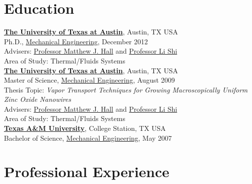 \documentclass[centered]{res}
\begin{document}
\begin{resume}
\section{Education}
%
\href{http://www.utexas.edu/}{\textbf{The University of Texas at
    Austin}}, Austin, TX USA \\
Ph.D., \href{http://www.me.utexas.edu/}{Mechanical Engineering},
December 2012 \\
Advisers:
\href{http://www.me.utexas.edu/directory/faculty/hall/matthew/33/}{Professor
  Matthew J. Hall} and \href{http://www.me.utexas.edu/~lishi/}{Professor Li Shi}\\
Area of Study: Thermal/Fluids Systems \\
%
\href{http://www.utexas.edu/}{\textbf{The University of Texas at
    Austin}}, Austin, TX USA \\
Master of Science, \href{http://www.me.utexas.edu/}{Mechanical
  Engineering}, August
2009 \\
Thesis Topic: \emph{Vapor Transport Techniques for Growing
  Macroscopically Uniform Zinc Oxide Nanowires} \\
Advisers:
\href{http://www.me.utexas.edu/directory/faculty/hall/matthew/33/}{Professor
  Matthew J. Hall} and \href{http://www.me.utexas.edu/~lishi/}{Professor Li Shi}\\
Area of Study: Thermal/Fluids Systems \\
%
\href{http://www.tamu.edu/}{\textbf{Texas A\&M University}}, College
Station, TX USA \\
Bachelor of Science, \href{http://www.mengr.tamu.edu/}{Mechanical
  Engineering}, May
2007  

\section{Professional Experience}


\end{resume}
\end{document}
